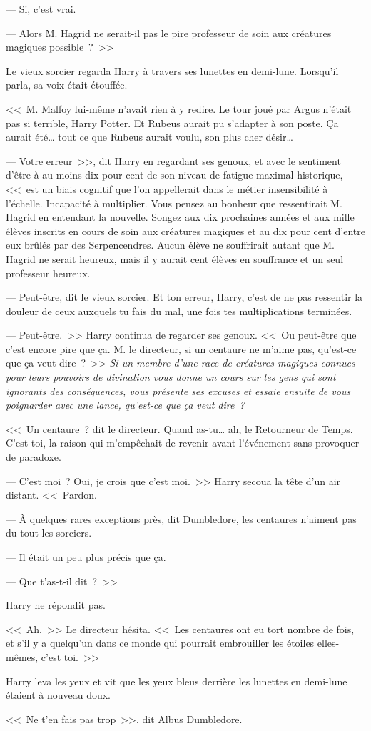 --- Si, c'est vrai.

--- Alors M. Hagrid ne serait-il pas le pire professeur de soin aux créatures magiques possible~?~>>

Le vieux sorcier regarda Harry à travers ses lunettes en demi-lune. Lorsqu'il parla, sa voix était étouffée.

<<~M. Malfoy lui-même n'avait rien à y redire. Le tour joué par Argus n'était pas si terrible, Harry Potter. Et Rubeus aurait pu s'adapter à son poste. Ça aurait été… tout ce que Rubeus aurait voulu, son plus cher désir…

--- Votre erreur~>>, dit Harry en regardant ses genoux, et avec le sentiment d'être à au moins dix pour cent de son niveau de fatigue maximal historique, <<~est un biais cognitif que l'on appellerait dans le métier insensibilité à l'échelle. Incapacité à multiplier. Vous pensez au bonheur que ressentirait M. Hagrid en entendant la nouvelle. Songez aux dix prochaines années et aux mille élèves inscrits en cours de soin aux créatures magiques et au dix pour cent d'entre eux brûlés par des Serpencendres. Aucun élève ne souffrirait autant que M. Hagrid ne serait heureux, mais il y aurait cent élèves en souffrance et un seul professeur heureux.

--- Peut-être, dit le vieux sorcier. Et ton erreur, Harry, c'est de ne pas ressentir la douleur de ceux auxquels tu fais du mal, une fois tes multiplications terminées.

--- Peut-être.~>> Harry continua de regarder ses genoux. <<~Ou peut-être que c'est encore pire que ça. M. le directeur, si un centaure ne m'aime pas, qu'est-ce que ça veut dire~?~>> \emph{Si un membre d'une race de créatures magiques connues pour leurs pouvoirs de divination vous donne un cours sur les gens qui sont ignorants des conséquences, vous présente ses excuses et essaie ensuite de vous poignarder avec une lance, qu'est-ce que ça veut dire~?}

<<~Un centaure~? dit le directeur. Quand as-tu… ah, le Retourneur de Temps. C'est toi, la raison qui m'empêchait de revenir avant l'événement sans provoquer de paradoxe.

--- C'est moi~? Oui, je crois que c'est moi.~>> Harry secoua la tête d'un air distant. <<~Pardon.

--- À quelques rares exceptions près, dit Dumbledore, les centaures n'aiment pas du tout les sorciers.

--- Il était un peu plus précis que ça.

--- Que t'as-t-il dit~?~>>

Harry ne répondit pas.

<<~Ah.~>> Le directeur hésita. <<~Les centaures ont eu tort nombre de fois, et s'il y a quelqu'un dans ce monde qui pourrait embrouiller les étoiles elles-mêmes, c'est toi.~>>

Harry leva les yeux et vit que les yeux bleus derrière les lunettes en demi-lune étaient à nouveau doux.

<<~Ne t'en fais pas trop~>>, dit Albus Dumbledore. 
